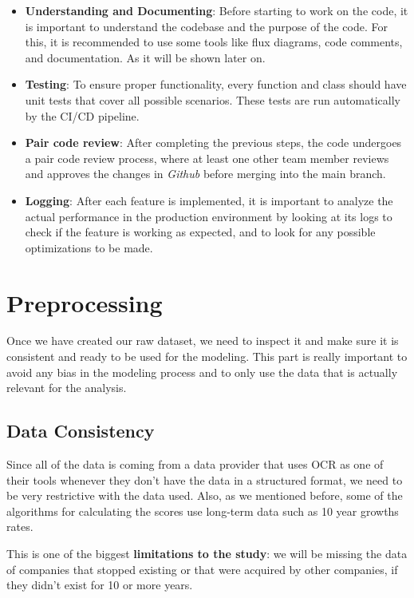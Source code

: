 \documentclass[11pt,english,a4paper,hidelinks]{book}
\begin{document}
\begin{itemize}
  \item \textbf{Understanding and Documenting}: Before starting to work on the code, it is important to understand the codebase and the purpose of the code. For this, it is recommended to use some tools like flux diagrams, code comments, and documentation. As it will be shown later on.
  \item \textbf{Testing}: To ensure proper functionality, every function and class should have unit tests that cover all possible scenarios. These tests are run automatically by the CI/CD pipeline.
  \item \textbf{Pair code review}: After completing the previous steps, the code undergoes a pair code review process, where at least one other team member reviews and approves the changes in \textit{Github} before merging into the main branch.
  \item \textbf{Logging}: After each feature is implemented, it is important to analyze the actual performance in the production environment by looking at its logs to check if the feature is working as expected, and to look for any possible optimizations to be made.
\end{itemize}

\section{Preprocessing}

Once we have created our raw dataset, we need to inspect it and make sure it is consistent and ready to be used for the modeling. This part is really important to avoid any bias in the modeling process and to only use the data that is actually relevant for the analysis.

\subsection{Data Consistency}

Since all of the data is coming from a data provider that uses OCR as one of their tools whenever they don't have the data in a structured format, we need to be very restrictive with the data used. Also, as we mentioned before, some of the algorithms for calculating the scores use long-term data such as 10 year growths rates.

\vspace{0.5cm}
\noindent This is one of the biggest \textbf{limitations to the study}: we will be missing the data of companies that stopped existing or that were acquired by other companies, if they didn't exist for 10 or more years.
\end{document}
